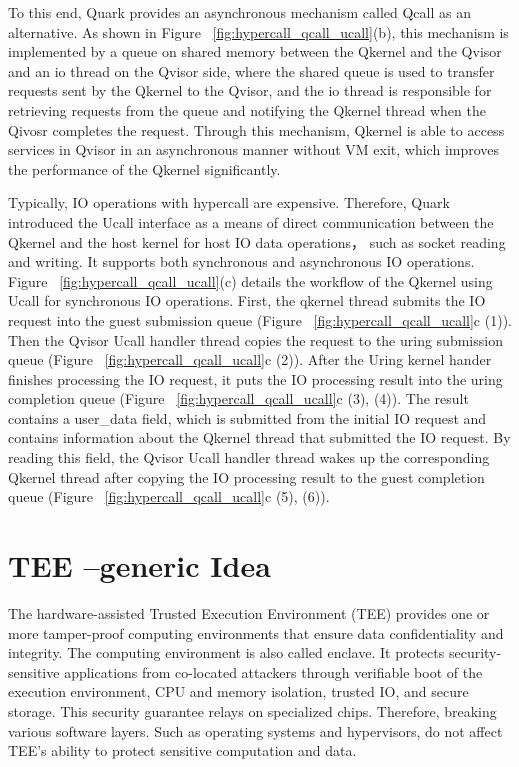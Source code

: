 To this end, Quark provides an asynchronous mechanism called Qcall as an alternative. 
As shown in Figure ~\ref{fig:hypercall_qcall_ucall}(b), this mechanism is implemented by a queue on shared memory between the Qkernel and the Qvisor and an io thread on the Qvisor side, where the
shared queue is used to transfer requests sent by the Qkernel to the Qvisor, and the io thread is responsible for retrieving requests from the queue and notifying the Qkernel thread when the Qivosr completes 
the request. Through this mechanism, Qkernel is able to access services in Qvisor in an asynchronous manner without VM exit, which improves the performance of the Qkernel significantly.

Typically, IO operations with hypercall are expensive. Therefore, Quark introduced the Ucall interface as a means of direct communication between the Qkernel and the host kernel for host 
IO data operations，  such as socket reading and writing. It supports both synchronous and asynchronous IO operations. Figure ~\ref{fig:hypercall_qcall_ucall}(c) details the workflow of the Qkernel 
using Ucall for synchronous IO operations. First, the qkernel thread submits the IO request into the guest submission queue (Figure ~\ref{fig:hypercall_qcall_ucall}c (1)). Then the Qvisor Ucall handler thread copies the request to the uring submission 
queue (Figure ~\ref{fig:hypercall_qcall_ucall}c (2)). After the Uring kernel hander finishes processing the IO request, it puts the IO processing result into the uring completion queue (Figure ~\ref{fig:hypercall_qcall_ucall}c (3), (4)). The result 
contains a user\_data field, which is submitted from the initial IO request and contains information about the Qkernel thread that submitted the IO request. By reading this field, the Qvisor Ucall handler thread wakes up the corresponding Qkernel thread 
after copying the IO processing result to the guest completion queue (Figure ~\ref{fig:hypercall_qcall_ucall}c (5), (6)).



\section{TEE --generic Idea}
The hardware-assisted Trusted Execution Environment (TEE) provides one or more tamper-proof computing environments that ensure data confidentiality and integrity. The computing environment is also called enclave. It protects security-sensitive applications from co-located attackers 
through verifiable boot of the execution environment, CPU and memory isolation, trusted IO, and secure storage\cite*{Hardware-supported-TEE}. This security guarantee relays on specialized chips. Therefore, breaking various software layers.
Such as operating systems and hypervisors, do not affect TEE's ability to protect sensitive computation and data\cite*{7345265}.

